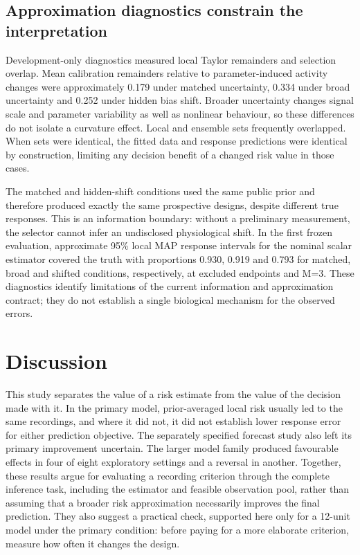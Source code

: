\subsection{Approximation diagnostics constrain the interpretation}

Development-only diagnostics measured local Taylor remainders and selection overlap. Mean calibration remainders relative to parameter-induced activity changes were approximately 0.179 under matched uncertainty, 0.334 under broad uncertainty and 0.252 under hidden bias shift. Broader uncertainty changes signal scale and parameter variability as well as nonlinear behaviour, so these differences do not isolate a curvature effect. Local and ensemble sets frequently overlapped. When sets were identical, the fitted data and response predictions were identical by construction, limiting any decision benefit of a changed risk value in those cases.

The matched and hidden-shift conditions used the same public prior and therefore produced exactly the same prospective designs, despite different true responses. This is an information boundary: without a preliminary measurement, the selector cannot infer an undisclosed physiological shift. In the first frozen evaluation, approximate 95\% local MAP response intervals for the nominal scalar estimator covered the truth with proportions 0.930, 0.919 and 0.793 for matched, broad and shifted conditions, respectively, at excluded endpoints and M=3. These diagnostics identify limitations of the current information and approximation contract; they do not establish a single biological mechanism for the observed errors.

\section{Discussion}

This study separates the value of a risk estimate from the value of the decision made with it. In the primary model, prior-averaged local risk usually led to the same recordings, and where it did not, it did not establish lower response error for either prediction objective. The separately specified forecast study also left its primary improvement uncertain. The larger model family produced favourable effects in four of eight exploratory settings and a reversal in another. Together, these results argue for evaluating a recording criterion through the complete inference task, including the estimator and feasible observation pool, rather than assuming that a broader risk approximation necessarily improves the final prediction. They also suggest a practical check, supported here only for a 12-unit model under the primary condition: before paying for a more elaborate criterion, measure how often it changes the design.

